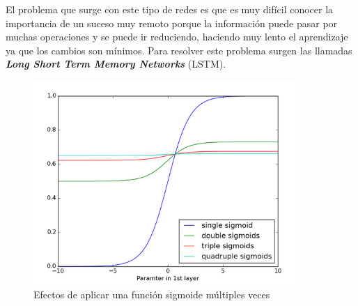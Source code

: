 \documentclass[12pt,spanish]{article}
\begin{document}
	El problema que surge con este tipo de redes es que es muy difícil conocer la importancia de un suceso muy remoto porque la información puede pasar por muchas operaciones y se puede ir reduciendo, haciendo muy lento el aprendizaje ya que los cambios son mínimos. Para resolver este problema surgen las llamadas \textbf{\textit{Long Short Term Memory Networks}} (LSTM).
	\begin{figure}[H]
		\centering
		\includegraphics[width=10cm]{Imagenes/sigmoid_vanishing_gradient.png}
		\begin{centering}
			\caption{Efectos de aplicar una función sigmoide múltiples veces}
		\end{centering}
	\end{figure}
	
\end{document}
